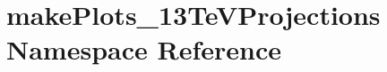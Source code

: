 \hypertarget{namespacemakePlots__13TeVProjections}{
\section{makePlots\_\-13TeVProjections Namespace Reference}
\label{namespacemakePlots__13TeVProjections}
}

